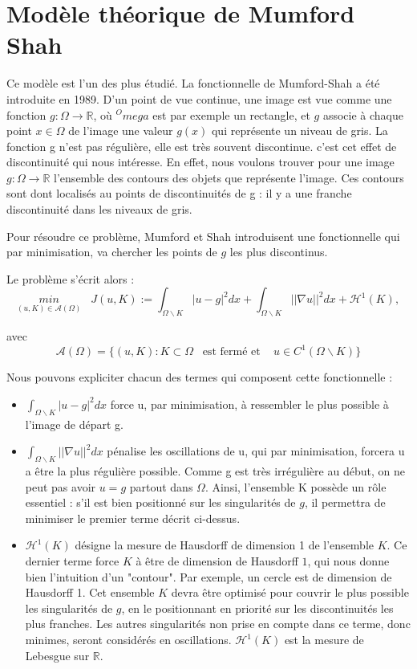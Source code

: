 \section{Modèle théorique de Mumford Shah}

Ce modèle est l'un des plus étudié. La fonctionnelle de Mumford-Shah a été introduite en 1989. D'un point de vue continue, une image est vue comme une fonction $g : \Omega \rightarrow \mathbb{R}$, où $^Omega$ est par exemple un rectangle, et $g$ associe à chaque point $x \in \Omega$ de l'image une valeur $g(x)$ qui représente un niveau de gris. La fonction g n'est pas régulière, elle est très souvent discontinue. c'est cet effet de discontinuité qui nous intéresse. En effet, nous voulons trouver pour une image $g : \Omega \rightarrow \mathbb{R}$ l'ensemble des contours des objets que représente l'image. Ces contours sont dont localisés au points de discontinuités de g : il y a une franche discontinuité dans les niveaux de gris.

Pour résoudre ce problème, Mumford et Shah introduisent une fonctionnelle qui par minimisation, va chercher les points de $g$ les plus discontinus.

\bigskip

Le problème s'écrit alors : 
\[\underset{(u, K) \in \mathcal{A}(\Omega)}{min} \; \; \; J(u,K) := \int_{\Omega \backslash K} |u - g |^2 dx + \int_{\Omega \backslash K} ||\nabla u ||^2 dx + \mathcal{H}^1(K) ,  \]

avec 
\[ \mathcal{A} (\Omega) = \{ (u,K) : K \subset \Omega \; \; \; \text{est fermé et } \; \; \; u \in C^1(\Omega \backslash K) \} \] 

Nous pouvons expliciter chacun des termes qui composent cette fonctionnelle :
\begin{itemize}
\item $\int_{\Omega \backslash K} |u - g |^2 dx $ force u, par minimisation, à ressembler le plus possible à l'image de départ g.

\item $\int_{\Omega \backslash K} ||\nabla u ||^2 dx $ pénalise les oscillations de u, qui par minimisation, forcera u a être la plus régulière possible. Comme g est très irrégulière au début, on ne peut pas avoir $ u = g$ partout dans $\Omega$. 
Ainsi, l'ensemble K possède un rôle essentiel : s'il est bien positionné sur les singularités de $g$, il permettra de minimiser le premier terme décrit ci-dessus.

\item $\mathcal{H}^1(K) $ désigne la mesure de Hausdorff de dimension 1 de l'ensemble $K$. Ce dernier terme force $K$ à être de dimension de Hausdorff $1$, qui nous donne bien l'intuition d'un "contour". Par exemple, un cercle est de dimension de Hausdorff 1. 
Cet ensemble $K$ devra être optimisé pour couvrir le plus possible les singularités de $g$, en le positionnant en priorité sur les discontinuités les plus franches. 
Les autres singularités non prise en compte dans ce terme, donc minimes, seront considérés en oscillations. $\mathcal{H}^1(K)$ est la mesure de Lebesgue sur $\mathbb{R}$.
\end{itemize}


